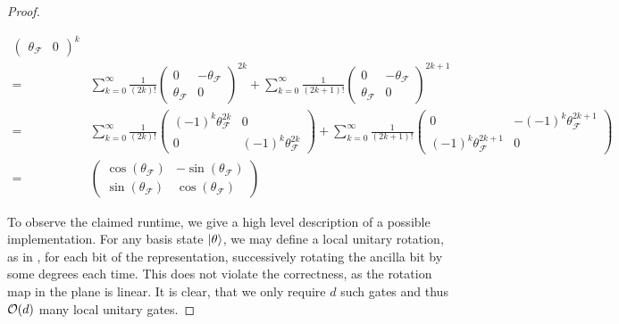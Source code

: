 \begin{proof}
\begin{enumerate}[label=(\arabic*)]
\begin{align}
\begin{pmatrix}
                \theta_{\mathcal{F}} & 0
            \end{pmatrix}^k\\
            =& \sum_{k=0}^\infty \frac{1}{(2k)!} \begin{pmatrix}
                0 & -\theta_{\mathcal{F}}\\
                \theta_{\mathcal{F}} & 0
            \end{pmatrix}^{2k} + \sum_{k=0}^\infty \frac{1}{(2k+1)!} \begin{pmatrix}
                0 & -\theta_{\mathcal{F}}\\
                \theta_{\mathcal{F}} & 0
            \end{pmatrix}^{2k+1}\\
            =& \sum_{k=0}^\infty \frac{1}{(2k)!} \begin{pmatrix}
                (-1)^k\theta_{\mathcal{F}}^{2k} & 0\\
                0 & (-1)^k\theta_{\mathcal{F}}^{2k}
            \end{pmatrix} + \sum_{k=0}^\infty \frac{1}{(2k+1)!} \begin{pmatrix}
                0 & -(-1)^k\theta_{\mathcal{F}}^{2k+1}\\
                (-1)^k\theta_{\mathcal{F}}^{2k+1} & 0
            \end{pmatrix}\\
            =& \begin{pmatrix}
                \cos(\theta_{\mathcal{F}}) & -\sin(\theta_{\mathcal{F}})\\
                \sin(\theta_{\mathcal{F}}) &  \cos(\theta_{\mathcal{F}})
            \end{pmatrix}
        \end{align}
    \end{enumerate}
    To observe the claimed runtime, we give a high level description of a possible implementation. For any basis state \(\ket{\theta}\), we may define a local unitary rotation, as in , for each bit of the representation, successively rotating the ancilla bit by some degrees each time. This does not violate the correctness, as the rotation map in the plane is linear. It is clear, that we only require \(d\) such gates and thus \(\operatorname{\mathcal{O}}(d)\) many local unitary gates.
\end{proof}

